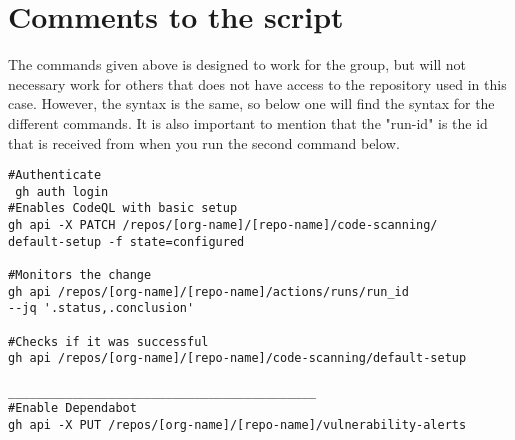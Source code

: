 \newpage
\section{Comments to the script}
The commands given above is designed to work for the group, but will not necessary work for others that does not have access to the repository used in this case. 
However, the syntax is the same, so below one will find the syntax for the different commands. It is also important to mention that the "run-id" is the id that is received  from when you run the second command below. 

\begin{tcolorbox}
\begin{verbatim}
#Authenticate
 gh auth login
#Enables CodeQL with basic setup
gh api -X PATCH /repos/[org-name]/[repo-name]/code-scanning/
default-setup -f state=configured

#Monitors the change
gh api /repos/[org-name]/[repo-name]/actions/runs/run_id 
--jq '.status,.conclusion'

#Checks if it was successful 
gh api /repos/[org-name]/[repo-name]/code-scanning/default-setup

___________________________________________
#Enable Dependabot
gh api -X PUT /repos/[org-name]/[repo-name]/vulnerability-alerts
 
\end{verbatim}
\end{tcolorbox}